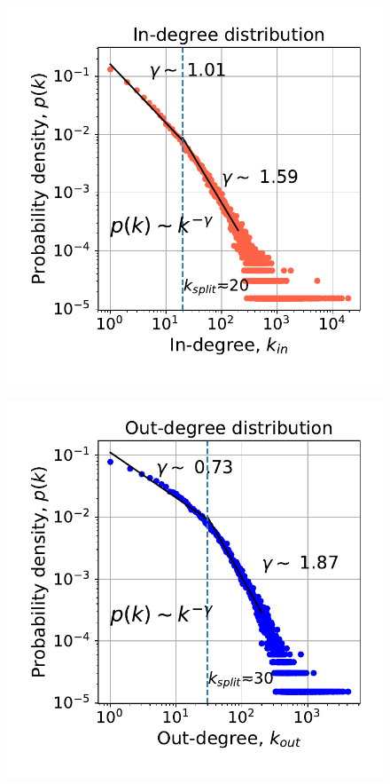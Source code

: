 \documentclass[12pt, twoside]{report}
\begin{document}
\begin{minipage}[b]{0.5\textwidth}
   \centering
    \begin{figure}[H]
      \includegraphics[width=\textwidth]{../../scripts/visualization/imgs/in_degree_distribution.pdf}            
          \caption{}
        \label{fig:in_degree}
\end{figure}
\end{minipage}
\begin{minipage}[b]{0.5\textwidth}
  \begin{figure}[H]
  \centering
  \includegraphics[width=\textwidth]{../../scripts/visualization/imgs/out_degree_distribution.pdf}            
        \caption{}
\label{fig:out_degree}
\end{figure}
\end{minipage}
    
\end{document}
